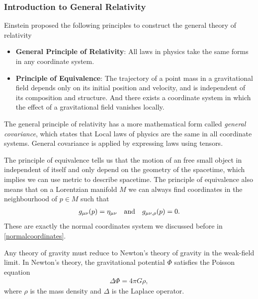 \documentclass[10pt]{article}
\begin{document}
\subsubsection{Introduction to General Relativity}
Einstein proposed the following principles to construct the general theory of relativity
\begin{itemize}
    \item \textbf{General Principle of Relativity}: All laws in physics take the same forms in any coordinate system.
    \item \textbf{Principle of Equivalence}: The trajectory of a point mass in a gravitational field depends only on its initial position and velocity, and is independent of its composition and structure.
          And there exists a coordinate system in which the effect of a gravitational field vanishes locally.
\end{itemize}
\begin{remark}
    The general principle of relativity has a more mathematical form called \textit{general covariance}, which states that Local laws of physics are the same in all coordinate systems.
    General covariance is applied by expressing laws using tensors.

    The principle of equivalence tells us that the motion of an free small object in independent of itself and only depend on the geometry of the spacetime, which implies we can use metric to describe spacetime.
    The principle of equivalence also means that on a Lorentzian manifold $M$ we can always find coordinates in the neighbourhood of $p\in M$ such that
    \begin{align}
        g_{\mu\nu}(p)=\eta_{\mu\nu}\qand g_{\mu\nu,\rho}(p)=0.
    \end{align}
    These are exactly the normal coordinates system we discussed before in \cref{normalcoordinates}.
\end{remark}

Any theory of gravity must reduce to Newton's theory of gravity in the weak-field limit.
In Newton's theory, the gravitational potential $\Phi$ satisfies the Poisson equation
\begin{align}\label{nequation}
    \Delta\Phi=4\pi G\rho,
\end{align}
where $\rho$ is the mass density and $\Delta$ is the Laplace operator.
\end{document}
